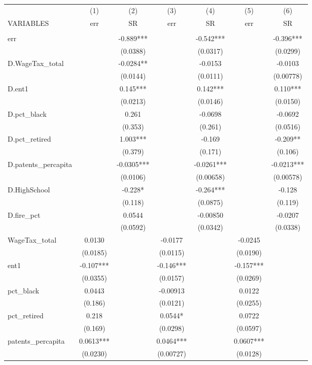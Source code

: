 \begin{tabular}{lcccccc} \hline
 & (1) & (2) & (3) & (4) & (5) & (6) \\
VARIABLES & err & SR & err & SR & err & SR \\ \hline
 &  &  &  &  &  &  \\
err &  & -0.889*** &  & -0.542*** &  & -0.396*** \\
 &  & (0.0388) &  & (0.0317) &  & (0.0299) \\
D.WageTax\_total &  & -0.0284** &  & -0.0153 &  & -0.0103 \\
 &  & (0.0144) &  & (0.0111) &  & (0.00778) \\
D.ent1 &  & 0.145*** &  & 0.142*** &  & 0.110*** \\
 &  & (0.0213) &  & (0.0146) &  & (0.0150) \\
D.pct\_black &  & 0.261 &  & -0.0698 &  & -0.0692 \\
 &  & (0.353) &  & (0.261) &  & (0.0516) \\
D.pct\_retired &  & 1.003*** &  & -0.169 &  & -0.209** \\
 &  & (0.379) &  & (0.171) &  & (0.106) \\
D.patents\_percapita &  & -0.0305*** &  & -0.0261*** &  & -0.0213*** \\
 &  & (0.0106) &  & (0.00658) &  & (0.00578) \\
D.HighSchool &  & -0.228* &  & -0.264*** &  & -0.128 \\
 &  & (0.118) &  & (0.0875) &  & (0.119) \\
D.fire\_pct &  & 0.0544 &  & -0.00850 &  & -0.0207 \\
 &  & (0.0592) &  & (0.0342) &  & (0.0338) \\
WageTax\_total & 0.0130 &  & -0.0177 &  & -0.0245 &  \\
 & (0.0185) &  & (0.0115) &  & (0.0190) &  \\
ent1 & -0.107*** &  & -0.146*** &  & -0.157*** &  \\
 & (0.0355) &  & (0.0157) &  & (0.0269) &  \\
pct\_black & 0.0443 &  & -0.00913 &  & 0.0122 &  \\
 & (0.186) &  & (0.0121) &  & (0.0255) &  \\
pct\_retired & 0.218 &  & 0.0544* &  & 0.0722 &  \\
 & (0.169) &  & (0.0298) &  & (0.0597) &  \\
patents\_percapita & 0.0613*** &  & 0.0464*** &  & 0.0607*** &  \\
 & (0.0230) &  & (0.00727) &  & (0.0128) &  \\

\end{tabular}
